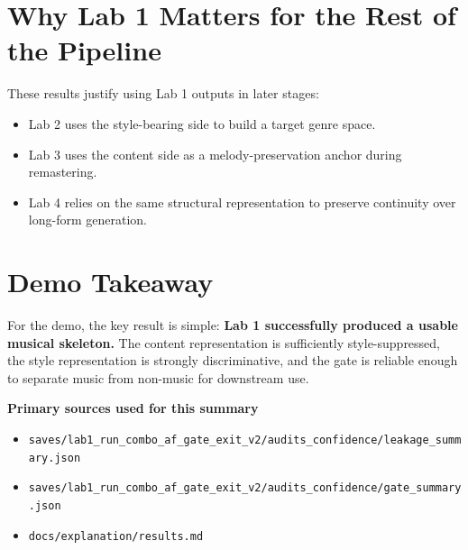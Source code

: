 \documentclass[11pt]{article}
\begin{document}
\section*{Why Lab 1 Matters for the Rest of the Pipeline}
These results justify using Lab 1 outputs in later stages:
\begin{itemize}
  \item Lab 2 uses the style-bearing side to build a target genre space.
  \item Lab 3 uses the content side as a melody-preservation anchor during remastering.
  \item Lab 4 relies on the same structural representation to preserve continuity over long-form generation.
\end{itemize}

\section*{Demo Takeaway}
For the demo, the key result is simple: \textbf{Lab 1 successfully produced a usable musical skeleton.} The content representation is sufficiently style-suppressed, the style representation is strongly discriminative, and the gate is reliable enough to separate music from non-music for downstream use.

\vspace{1em}
\noindent\textbf{Primary sources used for this summary}
\begin{itemize}
  \item \texttt{saves/lab1\_run\_combo\_af\_gate\_exit\_v2/audits\_confidence/leakage\_summary.json}
  \item \texttt{saves/lab1\_run\_combo\_af\_gate\_exit\_v2/audits\_confidence/gate\_summary.json}
  \item \texttt{docs/explanation/results.md}
\end{itemize}
\end{document}
